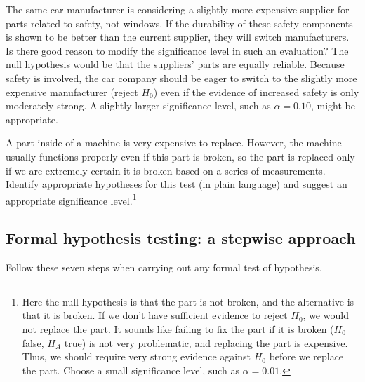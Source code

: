 \begin{example}{The same car manufacturer is considering a slightly more expensive supplier for parts related to safety, not windows. If the durability of these safety components is shown to be better than the current supplier, they will switch manufacturers. Is there good reason to modify the significance level in such an evaluation?}
The null hypothesis would be that the suppliers' parts are equally reliable. Because safety is involved, the car company should be eager to switch to the slightly more expensive manufacturer (reject $H_0$) even if the evidence of increased safety is only moderately strong. A slightly larger significance level, such as $\alpha=0.10$, might be appropriate.
\end{example}

\begin{exercise}
A part inside of a machine is very expensive to replace. However, the machine usually functions properly even if this part is broken, so the part is replaced only if we are extremely certain it is broken based on a series of measurements. Identify appropriate hypotheses for this test (in plain language) and suggest an appropriate significance level.\footnote{Here the null hypothesis is that the part is not broken, and the alternative is that it is broken. If we don't have sufficient evidence to reject $H_0$, we would not replace the part. It sounds like failing to fix the part if it is broken ($H_0$ false, $H_A$ true) is not very problematic, and replacing the part is expensive. Thus, we should require very strong evidence against $H_0$ before we replace the part. Choose a small significance level, such as $\alpha=0.01$.}
\end{exercise}



\subsection{Formal hypothesis testing: a stepwise approach}

Follow these seven steps when carrying out any formal test of hypothesis. 

